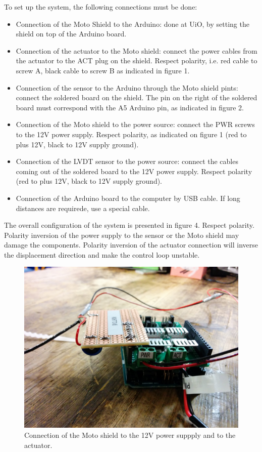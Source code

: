 \documentclass[pdftex,a4paper,12pt,onecolumn,fleqn,captions=tableheading]{scrartcl}
\begin{document}
To set up the system, the following connections must be done:

\begin{itemize}
\item Connection of the Moto Shield to the Arduino: done at UiO, by setting the shield on top of the Arduino board.
\item Connection of the actuator to the Moto shield: connect the power cables from the actuator to the ACT plug on the shield. Respect polarity, i.e. red cable to screw A, black cable to screw B as indicated in figure 1.
\item Connection of the sensor to the Arduino through the Moto shield pints: connect the soldered board on the shield. The pin on the right of the soldered board must correspond with the A5 Arduino pin, as indicated in figure 2.
\item Connection of the Moto shield to the power source: connect the PWR screws to the 12V power supply. Respect polarity, as indicated on figure 1 (red to plus 12V, black to 12V supply ground).
\item Connection of the LVDT sensor to the power source: connect the cables coming out of the soldered board to the 12V power supply. Respect polarity (red to plus 12V, black to 12V supply ground).
\item Connection of the Arduino board to the computer by USB cable. If long distances are requirede, use a special cable.
\end{itemize}

The overall configuration of the system is presented in figure 4. Respect polarity. Polarity inversion of the power supply to the sensor or the Moto shield may damage the components. Polarity inversion of the actuator connection will inverse the displacement direction and make the control loop unstable.

\begin{figure}
\begin{center}
\includegraphics[width=.49\textwidth]{Figures/IMG_20150928_140547.jpg}
\caption{Connection of the Moto shield to the 12V power suppply and to the actuator.}
\end{center}
\end{figure}
\end{document}
